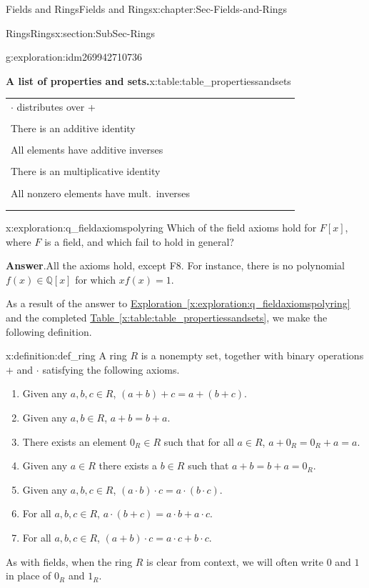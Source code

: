 \documentclass[oneside,10pt,]{book}
\numberwithin{equation}{section}
\newcommand{\hrulethin}  {\noalign{\hrule height 0.04em}}
\def\Q{{\mathbb Q}}
\begin{document}
\begin{chapterptx}{Fields and Rings}{}{Fields and Rings}{}{}{x:chapter:Sec-Fields-and-Rings}
\begin{sectionptx}{Rings}{}{Rings}{}{}{x:section:SubSec-Rings}
\begin{exploration}{}{g:exploration:idm269942710736}
\begin{tableptx}{\textbf{A list of properties and sets.}}{x:table:table_propertiessandsets}{}
{\begin{tabular}{lllllllllll}
\(\cdot\) distributes over +&&&&&&&&&&\tabularnewline[0pt]
&&&&&&&&&&\tabularnewline\hrulethin
There is an additive identity&&&&&&&&&&\tabularnewline[0pt]
&&&&&&&&&&\tabularnewline\hrulethin
All elements have additive inverses&&&&&&&&&&\tabularnewline[0pt]
&&&&&&&&&&\tabularnewline\hrulethin
There is an multiplicative identity&&&&&&&&&&\tabularnewline[0pt]
&&&&&&&&&&\tabularnewline\hrulethin
All nonzero elements have mult.~inverses&&&&&&&&&&\tabularnewline[0pt]
&&&&&&&&&&\tabularnewline\hrulethin
\end{tabular}
}%
\end{tableptx}%
\end{exploration}
\begin{exploration}{}{x:exploration:q_fieldaxiomspolyring}%
Which of the field axioms hold for \(F[x]\), where \(F\) is a field, and which fail to hold in general?%
\par\smallskip%
\noindent\textbf{Answer}.\hypertarget{g:answer:idm269942610192}{}\quad{}All the axioms hold, except F8. For instance, there is no polynomial \(f(x)\in \Q[x]\) for which \(x f(x) = 1\).%
\end{exploration}
As a result of the answer to \hyperref[x:exploration:q_fieldaxiomspolyring]{Exploration~\ref{x:exploration:q_fieldaxiomspolyring}} and the completed \hyperref[x:table:table_propertiessandsets]{Table~\ref{x:table:table_propertiessandsets}}, we make the following definition.%
\begin{definition}{}{x:definition:def_ring}%
A ring \(R\) is a nonempty set, together with binary operations \(+\) and \(\cdot\) satisfying the following axioms.%
\begin{enumerate}
\item{}Given any \(a,b,c\in R\), \((a+b)+c = a+(b+c)\).%
\item{}Given any \(a,b\in R\), \(a+b= b+a\).%
\item{}There exists an element \(0_R\in R\) such that for all \(a\in R\), \(a+0_R = 0_R + a = a\).%
\item{}Given any \(a\in R\) there exists a \(b\in R\) such that \(a+b = b + a =0_R\).%
\item{}Given any \(a,b,c\in R\), \((a\cdot b)\cdot c = a\cdot (b\cdot c)\).%
\item{}For all \(a,b,c\in R\), \(a\cdot (b+c) = a\cdot b + a\cdot c\).%
\item{}For all \(a,b,c\in R\), \((a+b)\cdot c = a\cdot c + b\cdot c\).%
\end{enumerate}
As with fields, when the ring \(R\) is clear from context, we will often write \(0\) and \(1\) in place of \(0_R\) and \(1_R\).%

\end{definition}
\end{sectionptx}
\end{chapterptx}
\end{document}

